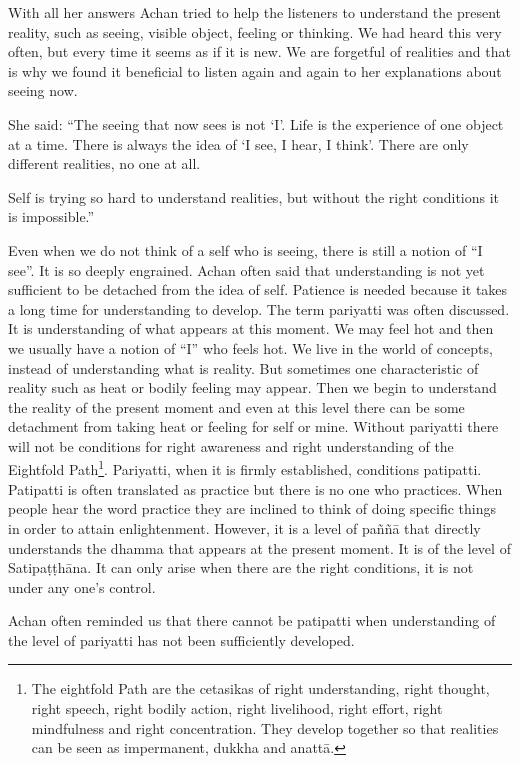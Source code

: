 With all her answers Achan tried to help the listeners to understand the present reality, such as seeing, visible object, feeling or thinking. We had heard this very often, 
but every time it seems as if it is new. We are forgetful of realities and that is why we 
found it beneficial to listen again and again to her explanations about seeing now. 

She said: ``The seeing that now sees is not `I’. Life is the experience of one object at a 
time. There is always the idea of `I see, I hear, I think’. There are only different realities, no one at all. 

Self is trying so hard to understand realities, but without the right conditions it is impossible.'' 

Even when we do not think of a self who is seeing, there is still a notion of ``I see”. It 
is so deeply engrained. Achan often said that understanding is not yet sufficient to be 
detached from the idea of self. Patience is needed because it takes a long time for understanding to develop. The term pariyatti was often discussed. It is understanding of 
what appears at this moment. We may feel hot and then we usually have a notion of 
``I'' who feels hot. We live in the world of concepts, instead of understanding what is 
reality. But sometimes one characteristic of reality such as heat or bodily feeling may 
appear. Then we begin to understand the reality of the present moment and even at 
this level there can be some detachment from taking heat or feeling for self or mine. 
Without pariyatti there will not be conditions for right awareness and right understanding of the Eightfold Path\footnote{The eightfold Path are the cetasikas of right understanding, right thought, right speech, right bodily action, right livelihood, right effort, right mindfulness and right concentration. They develop 
together so that realities can be seen as impermanent, dukkha and anattā. }. Pariyatti, when it is firmly established, conditions 
patipatti. Patipatti is often translated as practice but there is no one who practices. 
When people hear the word practice they are inclined to think of doing specific things 
in order to attain enlightenment. However, it is a level of paññā that directly understands the dhamma that appears at the present moment. It is of the level of 
Satipaṭṭhāna. It can only arise when there are the right conditions, it is not under any 
one’s control. 

Achan often reminded us that there cannot be patipatti when understanding of the 
level of pariyatti has not been sufficiently developed. 



